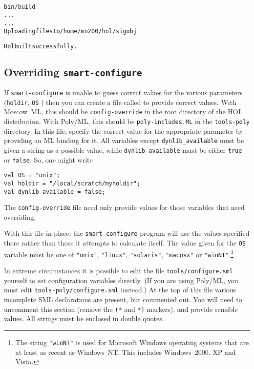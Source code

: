 \begin{session}
\begin{alltt}
\dol bin/build
  ...
  ...
Uploading files to /home/mn200/hol/sigobj

Hol built successfully.
\dol
\end{alltt}
\end{session}


\subsection{Overriding \texttt{smart-configure}}
\label{sec:editting-configure}

If \texttt{smart-configure} is unable to guess correct values for the
various parameters (\texttt{holdir}, \texttt{OS} \etc) then you can
create a file called to provide correct values.  With Moscow~ML, this
should be \texttt{config-override} in the root directory of the HOL
distribution.  With Poly/ML, this should be \texttt{poly-includes.ML}
in the \texttt{tools-poly} directory. In this file, specify the
correct value for the appropriate parameter by providing an ML binding
for it.  All variables except \texttt{dynlib\_available} must be given
a string as a possible value, while \texttt{dynlib\_available} must be
either \texttt{true} or \texttt{false}.  So, one might write

\begin{session}
\begin{verbatim}
val OS = "unix";
val holdir = "/local/scratch/myholdir";
val dynlib_available = false;
\end{verbatim}
\end{session}

The \texttt{config-override} file need only provide values for those
variables that need overriding.

With this file in place, the \texttt{smart-configure} program will use
the values specified there rather than those it attempts to calculate
itself.  The value given for the \texttt{OS} variable must be one of
\texttt{"unix"}, \texttt{"linux"}, \texttt{"solaris"},
\texttt{"macosx"} or \texttt{"winNT"}.\footnote{The string
  \texttt{"winNT"} is used for Microsoft Windows operating systems
  that are at least as recent as Windows~NT.  This includes
  Windows~2000, XP and Vista.}

In extreme circumstances it is possible to edit the file
\texttt{tools/configure.sml} yourself to set configuration variables
directly.  (If you are using Poly/ML, you must edit
\texttt{tools-poly/configure.sml} instead.) At the top of this file
various incomplete SML declarations are present, but commented out.
You will need to uncomment this section (remove the \texttt{(*} and
\texttt{*)} markers), and provide sensible values.  All strings must
be enclosed in double quotes.

